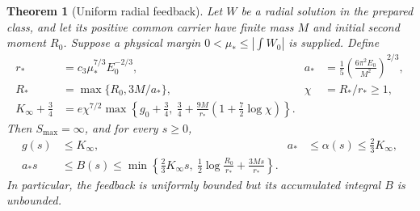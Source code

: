 \documentclass[11pt]{article}
\numberwithin{equation}{section}
\newtheorem{theorem}{Theorem}[section]
\begin{document}
\begin{theorem}[Uniform radial feedback]\label{thm:uniformfeedback}
Let $W$ be a radial solution in the prepared class, and let its
positive common carrier have finite mass $M$ and initial second
moment $R_0$. Suppose a physical margin
$0<\mu_*\le|\int W_0|$ is supplied. Define
\begin{align}
 r_*&=c_3\mu_*^{7/3}E_0^{-2/3},&
 a_*&=\frac15\left(\frac{6\pi^2E_0}{M^2}\right)^{2/3},\nonumber\\
 R_*&=\max\{R_0,3M/a_*\},&
 \chi&=R_*/r_*\ge1,\label{eq:uniformbudgets}\\
 K_\infty+\frac34
 &=e\chi^{7/2}\max\left\{
 g_0+\frac34,\ \frac34+\frac{9M}{r_*}\left(1+\frac72\log\chi\right)
 \right\}.\label{eq:uniformconstant}
\end{align}
Then $S_{\max}=\infty$, and for every $s\ge0$,
\begin{align}
 g(s)&\le K_\infty,&
 a_*&\le\alpha(s)\le\frac23K_\infty,\label{eq:uniformconclusion}\\
 a_*s&\le B(s)\le
 \min\left\{\frac23K_\infty s,\
 \frac12\log\frac{R_0}{r_*}+\frac{3Ms}{r_*}\right\}.
 \label{eq:uniformB}
\end{align}
In particular, the feedback is uniformly bounded but its accumulated
integral $B$ is unbounded.
\end{theorem}
\end{document}
